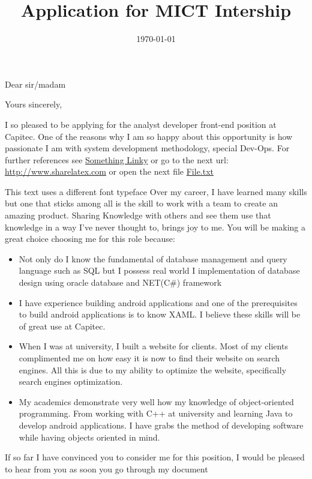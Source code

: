 \documentclass[11pt,a4paper,roman]{moderncv}        %
\title{Application for MICT Intership}                               %
\begin{document}

\date{\today}
\opening{Dear sir/madam}
\closing{Yours sincerely,}

\makelettertitle

I so pleased to be applying for the analyst developer front-end position at Capitec. One of the reasons why I am so happy about this opportunity is how passionate I am with system development methodology, special Dev-Ops.
For further references see \href{http://www.sharelatex.com}{Something 
Linky} or go to the next url: \url{http://www.sharelatex.com} or open 
the next file \href{run:./file.txt}{File.txt}

{\selectfont
This text uses a different font typeface
Over my career, I have learned many skills but one that sticks among all is the skill to work with a team to create an amazing product. Sharing Knowledge with others and see them use that knowledge in a way I’ve never thought to, brings joy to me. You will be making a great choice choosing me for this role because:
}


\vspace{0.5cm}

\begin{itemize} \itemsep 1em 
	\item Not only do I know the fundamental of database management and query language such as SQL but I possess real world I implementation of database design using oracle database and NET(C\#) framework
  
	\item I have experience building android applications and one of the prerequisites to build android applications is to know XAML. I believe these skills will be of great use at Capitec.


	\item When I was at university, I built a website for clients. Most of my clients complimented me on how easy it is now to find their website on search engines. All this is due to my ability to optimize the website, specifically search engines optimization.

	\item My academics demonstrate very well how my knowledge of object-oriented programming. From working with C++ at university and learning Java to develop android applications. I have grabs the method of developing software while having objects oriented in mind.
\end{itemize}

If so far I have convinced you to consider me for this position, I would be pleased to hear from you as soon you go through my document


\vspace{0.5cm}


\makeletterclosing
\end{document}
